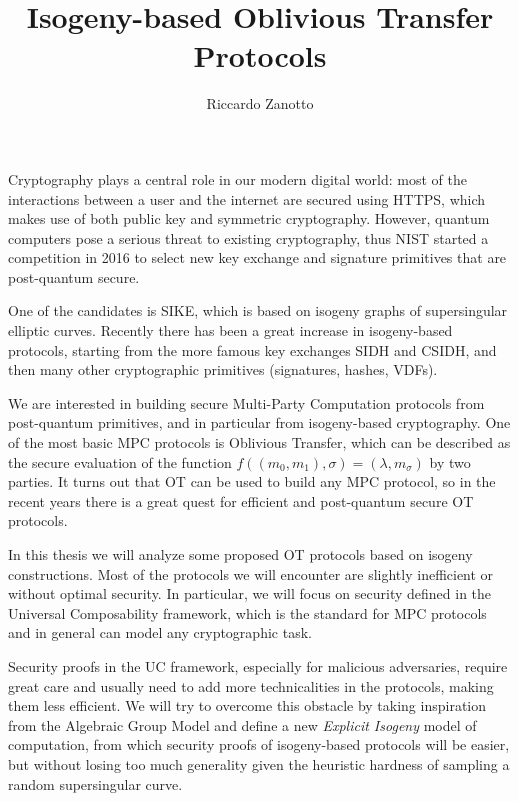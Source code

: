 \documentclass[]{article}
\title{Isogeny-based Oblivious Transfer Protocols}
\author{Riccardo Zanotto}
\begin{document}
\maketitle

Cryptography plays a central role in our modern digital world: most of the interactions between a user and the internet are secured using HTTPS, which makes use of both public key and symmetric cryptography. However, quantum computers pose a serious threat to existing cryptography, thus NIST started a competition in 2016 to select new key exchange and signature primitives that are post-quantum secure.

One of the candidates is SIKE, which is based on isogeny graphs of supersingular elliptic curves. Recently there has been a great increase in isogeny-based protocols, starting from the more famous key exchanges SIDH and CSIDH, and then many other cryptographic primitives (signatures, hashes, VDFs).

We are interested in building secure Multi-Party Computation protocols from post-quantum primitives, and in particular from isogeny-based cryptography. One of the most basic MPC protocols is Oblivious Transfer, which can be described as the secure evaluation of the function $f((m_0,m_1),\sigma)=(\lambda, m_\sigma)$ by two parties. It turns out that OT can be used to build any MPC protocol, so in the recent years there is a great quest for efficient and post-quantum secure OT protocols.

In this thesis we will analyze some proposed OT protocols based on isogeny constructions. Most of the protocols we will encounter are slightly inefficient or without optimal security. In particular, we will focus on security defined in the Universal Composability framework, which is the standard for MPC protocols and in general can model any cryptographic task.

Security proofs in the UC framework, especially for malicious adversaries, require great care and usually need to add more technicalities in the protocols, making them less efficient. We will try to overcome this obstacle by taking inspiration from the Algebraic Group Model and define a new \emph{Explicit Isogeny} model of computation, from which security proofs of isogeny-based protocols will be easier, but without losing too much generality given the heuristic hardness of sampling a random supersingular curve.
\end{document}
